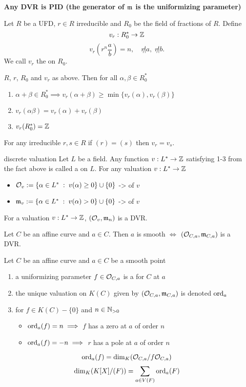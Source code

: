 \documentclass[twoside, a4paper, 12pt]{book}
\begin{document}
{\color{blue}\large\bfseries\centering Any DVR is PID (the generator of $\mathfrak{m}$ is the uniformizing parameter)}

Let $R$ be a UFD, $r\in R$ irreducible and $R_0$ be the field of fractions of $R$. Define
$$v_r:R_0^*\to \mathbb{Z}$$
$$v_r(r^n\frac{a}{b})=n,\quad r\not| a,\;r\not| b.$$
We call $v_r$ the  on $R_0$.

\begin{fact}{}{}
  $R$, $r$, $R_0$ and $v_r$ as above. Then for all $\alpha, \beta\in R_0^*$
  \begin{enumerate}
    \item $\alpha+\beta\in R_0^*\implies v_r(\alpha+\beta)\geq \min\{v_r(\alpha), v_r(\beta)\}$
    \item $v_r(\alpha\beta)=v_r(\alpha)+v_r(\beta)$
    \item $v_r(R_0^*)=\mathbb{Z}$
  \end{enumerate}
\end{fact}

For any irreducible $r,s\in R$ if $(r)=(s)$ then $v_r=v_s$.

\begin{definition}{discrete valuation}{}
  Let $L$ be a field. Any function $v:L^*\to \mathbb{Z}$ satisfying 1-3 from the fact above is called a  on $L$. For any valuation $v:L^*\to\mathbb{Z}$ 
  \begin{itemize}
    \item $\mathcal{O}_v:=\{\alpha\in L^*\;:\; v(\alpha)\geq 0\}\cup \{0\}$ ->  of $v$
    \item $\mathfrak{m}_v:=\{\alpha\in L^*\;:\; v(\alpha)>0\}\cup \{0\}$ ->  of $v$
  \end{itemize}
\end{definition}

For a valuation $v:L^*\to \mathbb{Z}$, $(\mathcal{O}_v,\mathfrak{m}_n)$ is a DVR.

\begin{theorem}{}{}
  Let $C$ be an affine curve and $a\in C$. Then $a$ is smooth $\iff$ $(\mathcal{O}_{C,a},\mathfrak{m}_{C,a})$ is a DVR.
\end{theorem}

\begin{definition}{}{}
  Let $C$ be an affine curve and $a\in C$ be a smooth point
  \begin{enumerate}
    \item a uniformizing parameter $f\in\mathcal{O}_{C,a}$ is a  for $C$ at $a$
    \item the unique valuation on $K(C)$ given by $(\mathcal{O}_{C,a},\mathfrak{m}_{C,a})$ is denoted $\operatorname{ord}_a$
    \item for $f\in K(C)-\{0\}$ and $n\in\mathbb{N}_{>0}$
      \begin{itemize}
        \item $\operatorname{ord}_a(f) =n\implies $ $f$ has a zero at $a$ of order $n$
        \item $\operatorname{ord}_a(f)=-n\implies$ $r$ has a pole at $a$ of order $n$
      \end{itemize}
  \end{enumerate}
\end{definition}
$$\operatorname{ord}_a(f)=\dim_K(\mathcal{O}_{C,a}/f\mathcal{O}_{C,a})$$
$$\dim_K(K[X]/(F))=\sum_{a\in V(F)}\operatorname{ord}_a(F)$$
\end{document}
